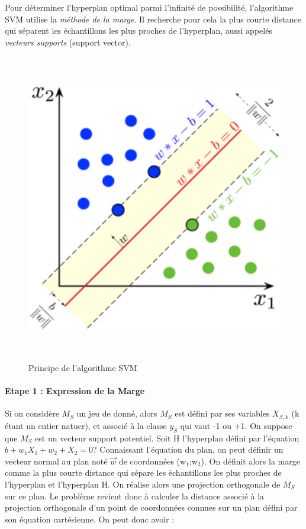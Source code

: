 \documentclass[
]{article}
\begin{document}
Pour déterminer l'hyperplan optimal parmi l'infinité de possibilité,
l'algorithme SVM utilise la \emph{méthode de la marge}. Il recherche
pour cela la plus courte distance qui séparent les échantillons les plus
proches de l'hyperplan, aussi appelés \emph{vecteurs supports} (support
vector).

\begin{figure}
\centering
\includegraphics[width=\textwidth,height=5.33333in]{ML/SVM_plan.png}
\caption{Principe de l'algorithme SVM}
\end{figure}

\hypertarget{etape-1-expression-de-la-marge}{%
\paragraph{Etape 1 : Expression de la
Marge}\label{etape-1-expression-de-la-marge}}

Si on considère \(M_S\) un jeu de donné, alors \(M_S\) est défini par
ses variables \(X_{S,k}\) (k étant un entier natuer), et associé à la
classe \(y_S\) qui vaut -1 ou +1. On suppose que \(M_S\) est un vecteur
support potentiel. Soit H l'hyperplan défini par l'équation
\(b+w_1X_1+w_2+X_2=0\)? Connaissant l'équation du plan, on peut définir
un vecteur normal au plan noté \(\vec{w}\) de coordonnées
(w\(_1\);w\(_2\)). On définit alors la marge comme la plus courte
distance qui sépare les échantillons les plus proches de l'hyperplan et
l'hyperplan H. On réalise alors une projection orthogonale de \(M_S\)
sur ce plan. Le problème revient donc à calculer la distance associé à
la projection orthogonale d'un point de coordonnées connues sur un plan
défini par son équation cartésienne. On peut donc avoir :
\end{document}
